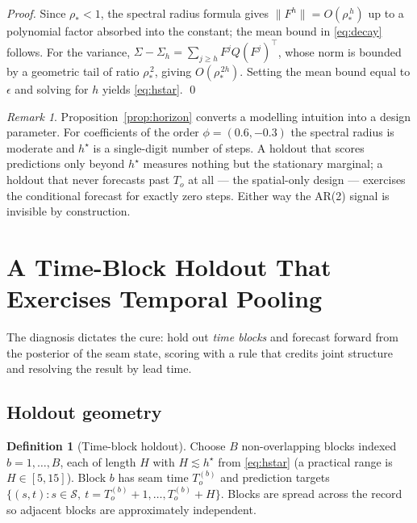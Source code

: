 \documentclass[11pt]{article}
\theoremstyle{definition}
\newtheorem{definition}{Definition}
\theoremstyle{remark}
\newtheorem{remark}{Remark}
\newcommand{\spradius}{\rho_{\!*}}
\begin{document}
\begin{proof}
Since $\spradius<1$, the spectral radius formula gives
$\|F^h\| = O(\spradius^{\,h})$ up to a polynomial factor absorbed into
the constant; the mean bound in \eqref{eq:decay} follows. For the
variance, $\Sigma - \Sigma_h = \sum_{j\ge h} F^j Q (F^j)^\top$, whose
norm is bounded by a geometric tail of ratio $\spradius^{\,2}$, giving
$O(\spradius^{\,2h})$. Setting the mean bound equal to $\epsilon$ and
solving for $h$ yields \eqref{eq:hstar}. \qed
\end{proof}

\begin{remark}
\label{rem:horizon-numbers}
Proposition~\ref{prop:horizon} converts a modelling intuition into a
design parameter. For coefficients of the order
$\phi=(0.6,-0.3)$ the spectral radius is moderate and $h^\star$ is a
single-digit number of steps. A holdout that scores predictions only
beyond $h^\star$ measures nothing but the stationary marginal; a
holdout that never forecasts past $T_o$ at all --- the spatial-only
design --- exercises the conditional forecast for exactly zero steps.
Either way the AR(2) signal is invisible by construction.
\end{remark}

\section{A Time-Block Holdout That Exercises Temporal Pooling}
\label{sec:redesign}

The diagnosis dictates the cure: hold out \emph{time blocks} and
forecast forward from the posterior of the seam state, scoring with a
rule that credits joint structure and resolving the result by lead
time.

\subsection{Holdout geometry}

\begin{definition}[Time-block holdout]
\label{def:blocks}
Choose $B$ non-overlapping blocks indexed $b=1,\dots,B$, each of length
$H$ with $H \lesssim h^\star$ from \eqref{eq:hstar} (a practical range
is $H\in[5,15]$). Block $b$ has seam time $T_o^{(b)}$ and prediction
targets $\{(s,t): s\in\mathcal{S},\ t = T_o^{(b)}+1,\dots,T_o^{(b)}+H\}$.
Blocks are spread across the record so adjacent blocks are
approximately independent.
\end{definition}
\end{document}
